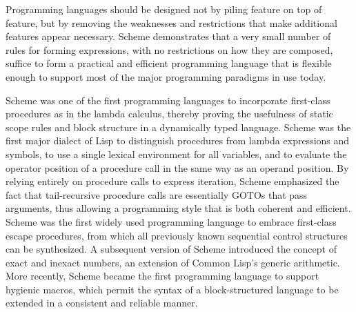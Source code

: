 
\label{historysection}

Programming languages should be designed not by piling feature on top of
feature, but by removing the weaknesses and restrictions that make additional
features appear necessary.  Scheme demonstrates that a very small number
of rules for forming expressions, with no restrictions on how they are
composed, suffice to form a practical and efficient programming language
that is flexible enough to support most of the major programming
paradigms in use today.

Scheme
was one of the first programming languages to incorporate first-class
procedures as in the lambda calculus, thereby proving the usefulness of
static scope rules and block structure in a dynamically typed language.
Scheme was the first major dialect of Lisp to distinguish procedures
from lambda expressions and symbols, to use a single lexical
environment for all variables, and to evaluate the operator position
of a procedure call in the same way as an operand position.  By relying
entirely on procedure calls to express iteration, Scheme emphasized the
fact that tail-recursive procedure calls are essentially GOTOs that
pass arguments, thus allowing a programming style that is both coherent
and efficient.  Scheme was the first widely used programming language to
embrace first-class escape procedures, from which all previously known
sequential control structures can be synthesized.  A subsequent
version of Scheme introduced the concept of exact and inexact numbers,
an extension of Common Lisp's generic arithmetic.
More recently, Scheme became the first programming language to support
hygienic macros, which permit the syntax of a block-structured language
to be extended in a consistent and reliable manner.

